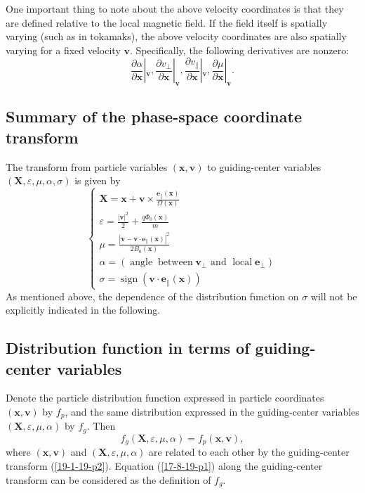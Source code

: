 \documentclass{article}
\newcommand{\infixand}{\text{ and }}
\newcommand{\nobracket}{}
\newcommand{\tmmathbf}[1]{\ensuremath{\boldsymbol{#1}}}
\newcommand{\tmop}[1]{\ensuremath{\operatorname{#1}}}
\begin{document}
One important thing to note about the above velocity coordinates is that they
are defined relative to the local magnetic field. If the field itself is
spatially varying (such as in tokamaks), the above velocity coordinates are
also spatially varying for a fixed velocity $\mathbf{v}$. Specifically, the
following derivatives are nonzero:
\begin{equation}
  \frac{\partial \alpha}{\partial \mathbf{x}} |_{\mathbf{v}} \nobracket,
  \frac{\partial v_{\perp}}{\partial \mathbf{x}} |_{\mathbf{v}} \nobracket,
  \frac{\partial v_{\parallel}}{\partial \mathbf{x}} |_{\mathbf{v}}
  \nobracket, \frac{\partial \mu}{\partial \mathbf{x}} |_{\mathbf{v}}
  \nobracket .
\end{equation}

\subsection{Summary of the phase-space coordinate transform}

The transform from particle variables $(\mathbf{x}, \mathbf{v})$ to
guiding-center variables $(\mathbf{X}, \varepsilon, \mu, \alpha, \sigma)$ is
given by
\begin{equation}
  \label{21-8-25-a1} \left\{\begin{array}{l}
    \mathbf{X} =\mathbf{x}+\mathbf{v} \times \frac{\tmmathbf{e}_{\parallel}
    (\mathbf{x})}{\Omega (\mathbf{x})}\\
    \varepsilon = \frac{| \mathbf{v} |^2}{2} + \frac{q \Phi_0
    (\mathbf{x})}{m}\\
    \mu = \frac{| \mathbf{v}-\mathbf{v} \cdot \mathbf{e}_{\parallel}
    (\mathbf{x}) |^2}{2 B_0 (\mathbf{x})}\\
    \alpha = \left( \tmop{angle} \tmop{between} \mathbf{v}_{\perp} \infixand
    \tmop{local} \mathbf{e}_{\perp} \right)\\
    \sigma = \tmop{sign} (\mathbf{v} \cdot \mathbf{e}_{\parallel}
    (\mathbf{x}))
  \end{array}\right.
\end{equation}
As mentioned above, the dependence of the distribution function on $\sigma$
will not be explicitly indicated in the following.

\subsection{Distribution function in terms of guiding-center variables}

Denote the particle distribution function expressed in particle coordinates
$(\mathbf{x}, \mathbf{v})$ by $f_p$, and the same distribution expressed in
the guiding-center variables $(\mathbf{X}, \varepsilon, \mu, \alpha)$ by
$f_g$. Then
\begin{equation}
  \label{17-8-19-p1} f_g (\mathbf{X}, \varepsilon, \mu, \alpha) = f_p
  (\mathbf{x}, \mathbf{v}),
\end{equation}
where $(\mathbf{x}, \mathbf{v})$ and $(\mathbf{X}, \varepsilon, \mu, \alpha)$
are related to each other by the guiding-center transform (\ref{19-1-19-p2}).
Equation (\ref{17-8-19-p1}) along the guiding-center transform can be
considered as the definition of $f_g$.
\end{document}
